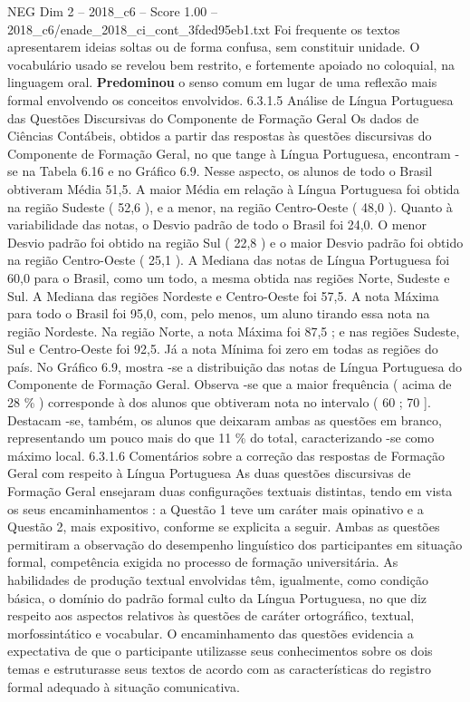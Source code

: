 \begin{textsample}{NEG Dim 2 – 2018\_c6 – Score 1.00 – 2018\_c6/enade\_2018\_ci\_cont\_3fded95eb1.txt}
Foi frequente os textos apresentarem ideias soltas ou de forma confusa, sem constituir unidade.
O vocabulário usado se revelou bem restrito, e fortemente apoiado no coloquial, na linguagem oral. \textbf{Predominou} o senso comum em lugar de uma reflexão mais formal envolvendo os conceitos envolvidos. 6.3.1.5 Análise de Língua Portuguesa das Questões Discursivas do Componente de Formação Geral Os dados de Ciências Contábeis, obtidos a partir das respostas às questões discursivas do Componente de Formação Geral, no que tange à Língua Portuguesa, encontram -se na Tabela 6.16 e no Gráfico 6.9.
Nesse aspecto, os alunos de todo o Brasil obtiveram Média 51,5.
A maior Média em relação à Língua Portuguesa foi obtida na região Sudeste ( 52,6 ), e a menor, na região Centro-Oeste ( 48,0 ).
Quanto à variabilidade das notas, o Desvio padrão de todo o Brasil foi 24,0.
O menor Desvio padrão foi obtido na região Sul ( 22,8 ) e o maior Desvio padrão foi obtido na região Centro-Oeste ( 25,1 ).
A Mediana das notas de Língua Portuguesa foi 60,0 para o Brasil, como um todo, a mesma obtida nas regiões Norte, Sudeste e Sul.
A Mediana das regiões Nordeste e Centro-Oeste foi 57,5.
A nota Máxima para todo o Brasil foi 95,0, com, pelo menos, um aluno tirando essa nota na região Nordeste.
Na região Norte, a nota Máxima foi 87,5 ; e nas regiões Sudeste, Sul e Centro-Oeste foi 92,5.
Já a nota Mínima foi zero em todas as regiões do país.
No Gráfico 6.9, mostra -se a distribuição das notas de Língua Portuguesa do Componente de Formação Geral.
Observa -se que a maior frequência ( acima de 28 \% ) corresponde à dos alunos que obtiveram nota no intervalo ( 60 ; 70 ].
Destacam -se, também, os alunos que deixaram ambas as questões em branco, representando um pouco mais do que 11 \% do total, caracterizando -se como máximo local. 6.3.1.6 Comentários sobre a correção das respostas de Formação Geral com respeito à Língua Portuguesa As duas questões discursivas de Formação Geral ensejaram duas configurações textuais distintas, tendo em vista os seus encaminhamentos : a Questão 1 teve um caráter mais opinativo e a Questão 2, mais expositivo, conforme se explicita a seguir.
Ambas as questões permitiram a observação do desempenho linguístico dos participantes em situação formal, competência exigida no processo de formação universitária.
As habilidades de produção textual envolvidas têm, igualmente, como condição básica, o domínio do padrão formal culto da Língua Portuguesa, no que diz respeito aos aspectos relativos às questões de caráter ortográfico, textual, morfossintático e vocabular.
O encaminhamento das questões evidencia a expectativa de que o participante utilizasse seus conhecimentos sobre os dois temas e estruturasse seus textos de acordo com as características do registro formal adequado à situação comunicativa.

\end{textsample}
